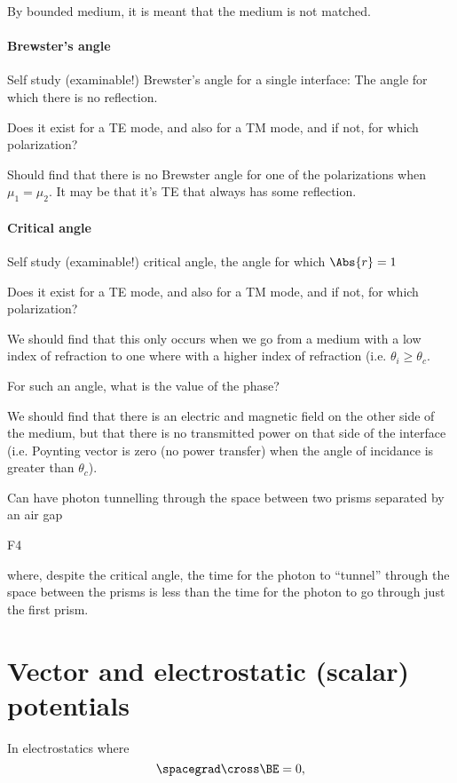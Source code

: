 By bounded medium, it is meant that the medium is not matched.

\paragraph{Brewster's angle}

Self study (examinable!) Brewster's angle for a single interface: The angle for which there is no reflection.

Does it exist for a TE mode, and also for a TM mode, and if not, for which polarization?

Should find that there is no Brewster angle for one of the polarizations when \( \mu_1 = \mu_2 \).  It may be that it's TE that always has some reflection.

\paragraph{Critical angle}

Self study (examinable!) critical angle, the angle for which \( \Abs{r} = 1 \)

Does it exist for a TE mode, and also for a TM mode, and if not, for which polarization?

We should find that this only occurs when we go from a medium with a low index of refraction to one where with a higher index of refraction (i.e. \( \theta_i \ge \theta_c \).

For such an angle, what is the value of the phase?

We should find that there is an electric and magnetic field on the other side of the medium, but that there is no transmitted power on that side of the interface (i.e. Poynting vector is zero (no power transfer) when the angle of incidance is greater than \( \theta_c \)).

Can have photon tunnelling through the space between two prisms separated by an air gap

F4

where, despite the critical angle, the time for the photon to ``tunnel'' through the space between the prisms is less than the time for the photon to go through just the first prism.

\section{Vector and electrostatic (scalar) potentials}

In electrostatics where
\begin{dmath}\label{eqn:emtLecture10:720}
\spacegrad \cross \BE  = 0,
\end{dmath}

